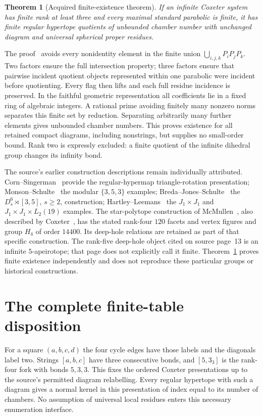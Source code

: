 \documentclass[11pt,a4paper]{article}
\newtheorem{theorem}{Theorem}
\begin{document}
\begin{theorem}[Acquired finite-existence theorem]\label{exist}
If an infinite Coxeter system has finite rank at least three and every
maximal standard parabolic is finite, it has finite regular hypertope
quotients of unbounded chamber number with unchanged diagram and universal
spherical proper residues.
\end{theorem}
The proof~\cite{existence} avoids every nonidentity element in the finite
union $\bigcup_{i,j,k}P_iP_jP_k$. Two factors ensure the full intersection
property; three factors ensure that pairwise incident quotient objects
represented within one parabolic were incident before quotienting. Every
flag then lifts and each full residue incidence is preserved. In the
faithful geometric representation all coefficients lie in a fixed ring of
algebraic integers. A rational prime avoiding finitely many nonzero norms
separates this finite set by reduction. Separating arbitrarily many further
elements gives unbounded chamber numbers. This proves existence for all
retained compact diagrams, including nonstrings, but supplies no small-order
bound. Rank two is expressly excluded: a finite quotient of the infinite
dihedral group changes its infinity bond.

The source's earlier construction descriptions remain individually attributed.
Corn--Singerman~\cite{Corn} provide the regular-hypermap triangle-rotation
presentation; Monson--Schulte~\cite{Monson} the modular $\{3,5,3\}$ examples;
Breda--Jones--Schulte~\cite{Breda} the $D_s^6\rtimes[3,5]$, $s\ge2$,
construction; Hartley--Leemans~\cite{Hartley} the $J_1\times J_1$ and
$J_1\times J_1\times L_2(19)$ examples. The star-polytope construction
of McMullen~\cite{Star}, also described by Coxeter~\cite{CoxeterPoly},
has the stated rank-four $120$ facets and vertex figures and group $H_4$
of order $14400$. Its deep-hole relations are retained as part of that
specific construction. The rank-five deep-hole object cited on source
page~13 is an infinite $5$-apeirotope; that page does not explicitly call
it finite. Theorem~\ref{exist} proves finite existence independently and
does not reproduce these particular groups or historical constructions.

\section{The complete finite-table disposition}\label{finite}
For a square $(a,b,c,d)$ the four cycle edges have those labels and the
diagonals label two. Strings $[a,b,c]$ have three consecutive bonds, and
$[5,3_3]$ is the rank-four fork with bonds $5,3,3$. This fixes the ordered
Coxeter presentations up to the source's permitted diagram relabelling.
Every regular hypertope with such a diagram gives a normal kernel in this
presentation of index equal to its number of chambers. No assumption of
universal local residues enters this necessary enumeration interface.
\end{document}

